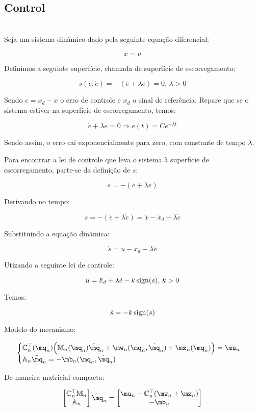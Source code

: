  \subsection{Control}\label{S03-2}
 
\\

Seja um sistema dinâmico dado pela seguinte equação diferencial:

$$ \ddot{x} = u $$

Definimos a seguinte superfície, chamada de superfície de escorregamento:

$$ s(e, \dot{e}) = - (\dot{e} + \lambda e) = 0, \, \lambda > 0 $$

Sendo $e = x_d - x$ o erro de controle e $x_d$ o sinal de referência. Repare que se o sistema estiver na superfície de escorregamento, temos:

$$ \dot{e} + \lambda e = 0 \Rightarrow e(t) = C e^{- \lambda t} $$

Sendo assim, o erro cai exponencialmente para zero, com constante de tempo $\lambda$.

Para encontrar a lei de controle que leva o sistema à superficie de escorregamento, parte-se da definição de $s$:

$$ s = -(\dot{e} + \lambda e) $$

Derivando no tempo:

$$ \dot{s} =  -(\ddot{e} + \lambda \dot{e}) = \ddot{x} - \ddot{x}_d - \lambda \dot{e} $$

Substituindo a equação dinâmica:

$$ \dot{s} = u - \ddot{x}_d - \lambda \dot{e} $$

Utizando a seguinte lei de controle:

$$ u = \ddot{x}_d + \lambda \dot{e} - k \operatorname*{sign} (s), \, k>0$$

Temos:

$$ \dot{s} = -k \operatorname*{sign}(s) $$


 
Modelo do mecanismo:

$$
\begin{cases}
\mC_n^\top (\mq_n) \Big( \mM_n (\mq_n) \ddot{\mq}_n + \mw_n (\mq_n, \dot{\mq}_n) + \mz_n (\mq_n) \Big) = \mu_n \\
\mA_n \ddot{\mq}_n = - \mb_n (\mq_n, \dot{\mq}_n)
\end{cases}
$$

De maneira matricial compacta:

$$
\begin{bmatrix}
\mC_n^\top \mM_n \\
\mA_n
\end{bmatrix}
\ddot{\mq}_n
=
\begin{bmatrix}
\mu_n - \mC_n^\top(\mw_n + \mz_n) \\
-\mb_n
\end{bmatrix}
$$

